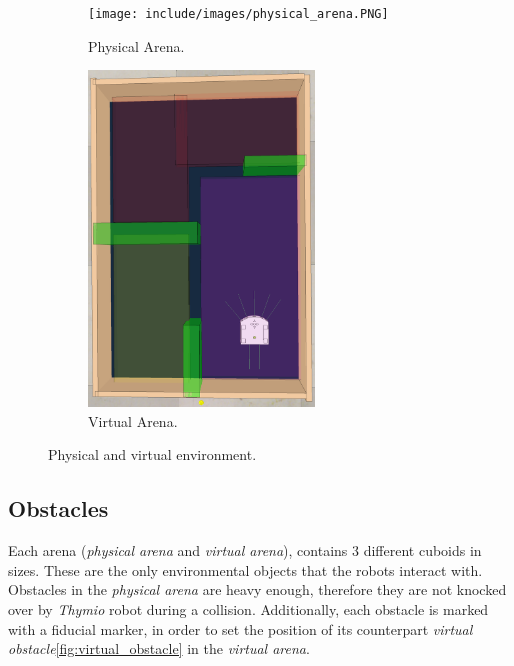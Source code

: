 \begin{figure}[H]
    \centering
    \begin{subfigure}[b]{0.4\textwidth}
    	\centering
        \texttt{[image: include/images/physical\_arena.PNG]}
        \caption{Physical Arena.}
        \label{fig:physical_arena}
    \end{subfigure}
    \begin{subfigure}[b]{0.4\textwidth}
    	\centering
        \includegraphics[width=6cm]{include/images/virtual_arena.PNG}
        \caption{Virtual Arena.}
        \label{fig:virtual_arena}
    \end{subfigure}
    \caption{Physical and virtual environment.}\label{sistemass1}
\end{figure}

\subsection{Obstacles}

Each arena (\emph{physical arena} and \emph{virtual arena}), contains 3 different cuboids in sizes. These are the only environmental objects that the robots interact with. Obstacles in the \emph{physical arena} are heavy enough, therefore they are not knocked over by \emph{Thymio} robot during a collision. Additionally, each obstacle is marked with a fiducial marker, in order to set the position of its counterpart \emph{virtual obstacle}\ref{fig:virtual_obstacle} in the \emph{virtual arena}.

